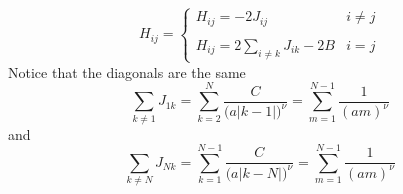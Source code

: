 \documentclass[../../../main.tex]{subfiles}
\begin{document}
\begin{equation*}
    H_{ij} =
    \begin{cases}
        H_{ij} = -2 J_{ij}                     & i\neq j \\\\
        H_{ij} = 2 \sum_{i \neq k}  J_{ik} -2B & i=j
    \end{cases}
\end{equation*}
Notice that the diagonals are the same
\begin{equation*}
    \sum_{k \neq 1}  J_{1k} = \sum_{k=2}^{N}\frac{C}{\bigl(a|k-1|\bigr)^{\nu}} = \sum_{m=1}^{N-1}\frac{1}{(am)^{\nu}}
\end{equation*}
and
\begin{equation*}
    \sum_{k \neq N}  J_{Nk} = \sum_{k=1}^{N-1}\frac{C}{\bigl(a|k-N|\bigr)^{\nu}} = \sum_{m=1}^{N-1}\frac{1}{(am)^{\nu}}
\end{equation*}
\end{document}
